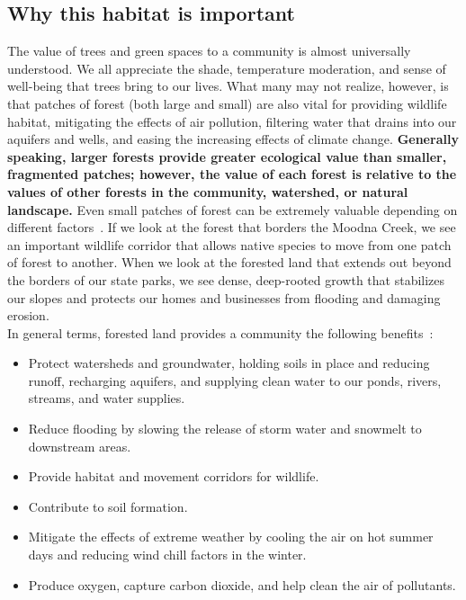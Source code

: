 \subsection*{Why this habitat is important}
The value of trees and green spaces to a community is almost universally
understood. We all appreciate the shade, temperature moderation, and sense of
well-being that trees bring to our lives. What many may not realize, however,
is that patches of forest (both large and small) are also vital for providing
wildlife habitat, mitigating the effects of air pollution, filtering water that
drains into our aquifers and wells, and easing the increasing effects of
climate change. \textbf{Generally speaking, larger forests provide greater
ecological value than smaller, fragmented patches; however, the value of each
forest is relative to the values of other forests in the community, watershed,
or natural landscape.} Even small patches of forest can be extremely valuable
depending on different factors~\citep{haeckel2014}. If we look at the forest
that borders the Moodna Creek, we see an important wildlife corridor that
allows native species to move from one patch of forest to another. When we look
at the forested land that extends out beyond the borders of our state parks, we
see dense, deep-rooted growth that stabilizes our slopes and protects our homes
and businesses from flooding and damaging erosion.\\
In general terms, forested land provides a community the following benefits~\citep{bradfordcc}:
\begin{itemize}
    \item Protect watersheds and groundwater, holding soils in place and 
    reducing runoff, recharging aquifers, and supplying clean water to our 
    ponds, rivers, streams, and water supplies.
    \item Reduce flooding by slowing the release of storm water and snowmelt to downstream areas.
    \item Provide habitat and movement corridors for wildlife.
    \item Contribute to soil formation.
    \item Mitigate the effects of extreme weather by cooling the air on hot summer days and reducing wind chill factors in the winter.
    \item Produce oxygen, capture carbon dioxide, and help clean the air of pollutants.
\end{itemize}
